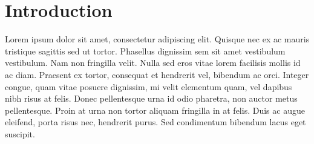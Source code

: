 \documentclass[11pt,a4paper,dvipsnames]{article}
\begin{document}
\tableofcontents

\section{Introduction}

Lorem ipsum dolor sit amet, consectetur adipiscing elit. Quisque nec ex ac mauris tristique sagittis sed ut tortor. Phasellus dignissim sem sit amet vestibulum vestibulum. Nam non fringilla velit. Nulla sed eros vitae lorem facilisis mollis id ac diam. Praesent ex tortor, consequat et hendrerit vel, bibendum ac orci. Integer congue, quam vitae posuere dignissim, mi velit elementum quam, vel dapibus nibh risus at felis. Donec pellentesque urna id odio pharetra, non auctor metus pellentesque. Proin at urna non tortor aliquam fringilla in at felis. Duis ac augue eleifend, porta risus nec, hendrerit purus. Sed condimentum bibendum lacus eget suscipit.




\clearpage

\appendix
\end{document}
